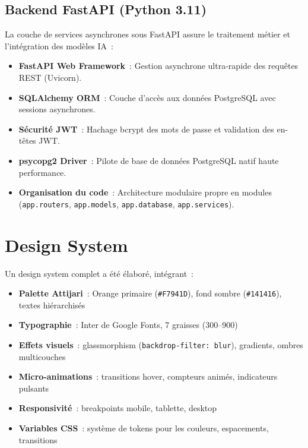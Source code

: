 \documentclass[12pt,a4paper]{report}
\begin{document}
\subsection{Backend FastAPI (Python 3.11)}

La couche de services asynchrones sous FastAPI assure le traitement métier et l'intégration des modèles IA~:

\begin{itemize}[noitemsep]
    \item \textbf{FastAPI Web Framework}~: Gestion asynchrone ultra-rapide des requêtes REST (Uvicorn).
    \item \textbf{SQLAlchemy ORM}~: Couche d'accès aux données PostgreSQL avec sessions asynchrones.
    \item \textbf{Sécurité JWT}~: Hachage bcrypt des mots de passe et validation des en-têtes JWT.
    \item \textbf{psycopg2 Driver}~: Pilote de base de données PostgreSQL natif haute performance.
    \item \textbf{Organisation du code}~: Architecture modulaire propre en modules (\texttt{app.routers}, \texttt{app.models}, \texttt{app.database}, \texttt{app.services}).
\end{itemize}

\section{Design System}

Un design system complet a été élaboré, intégrant~:

\begin{itemize}[noitemsep]
    \item \textbf{Palette Attijari}~: Orange primaire (\texttt{\#F7941D}), fond sombre (\texttt{\#141416}), textes hiérarchisés
    \item \textbf{Typographie}~: Inter de Google Fonts, 7 graisses (300--900)
    \item \textbf{Effets visuels}~: glassmorphism (\texttt{backdrop-filter: blur}), gradients, ombres multicouches
    \item \textbf{Micro-animations}~: transitions hover, compteurs animés, indicateurs pulsants
    \item \textbf{Responsivité}~: breakpoints mobile, tablette, desktop
    \item \textbf{Variables CSS}~: système de tokens pour les couleurs, espacements, transitions
\end{itemize}
\end{document}
